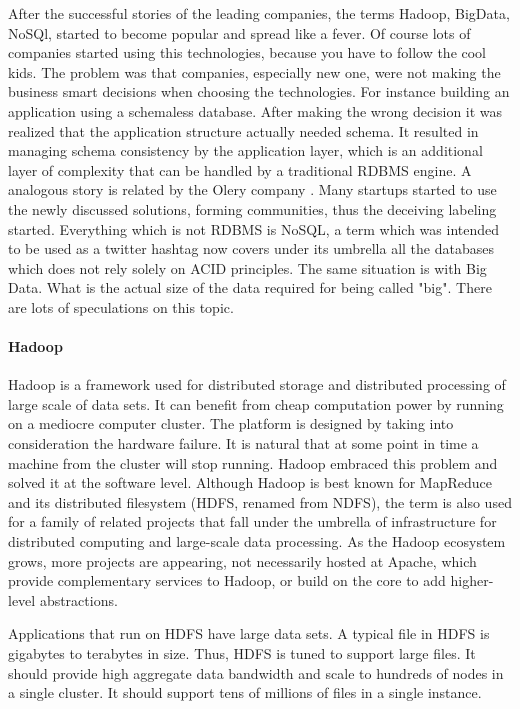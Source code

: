 After the successful stories of the leading companies, the terms Hadoop, BigData, NoSQl, started to become popular and spread like a fever. Of course lots of companies started using this technologies, because you have to follow the cool kids. The problem was that companies, especially new one, were not making the business smart decisions when choosing the technologies. For instance building an application using a schemaless database. After making the wrong decision it was realized that the application structure actually needed schema. It resulted in managing schema consistency by the application layer, which is an additional layer of complexity that can be handled by a traditional RDBMS engine. A analogous story is related by the Olery company \cite{mongo_to_postgres}. Many startups started to use the newly discussed solutions, forming communities, thus the deceiving labeling started. Everything which is not RDBMS is NoSQL, a term which was intended to be used as a twitter hashtag now covers under its umbrella all the databases which does not rely solely on ACID principles. The same situation is with Big Data. What is the actual size of the data required for being called "big". There are lots of speculations on this topic.

\paragraph{Hadoop}
Hadoop is a framework used for distributed storage and distributed processing of large scale of data sets. It can benefit from cheap computation power by running on a mediocre computer cluster. The platform is designed by taking into consideration the hardware failure. It is natural that at some point in time a machine from the cluster will stop running. Hadoop embraced this problem and solved it at the software level. Although Hadoop is best known for MapReduce and its distributed filesystem (HDFS, renamed from NDFS), the term is also used for a family of related projects that fall under the umbrella of infrastructure for distributed computing and large-scale data processing. As the Hadoop ecosystem grows, more projects are appearing, not necessarily hosted at Apache, which provide complementary services to Hadoop, or build on the core to add higher-level abstractions.

Applications that run on HDFS have large data sets. A typical file in HDFS is gigabytes to terabytes in size. Thus, HDFS is tuned to support large files. It should provide high aggregate data bandwidth and scale to hundreds of nodes in a single cluster. It should support tens of millions of files in a single instance.

